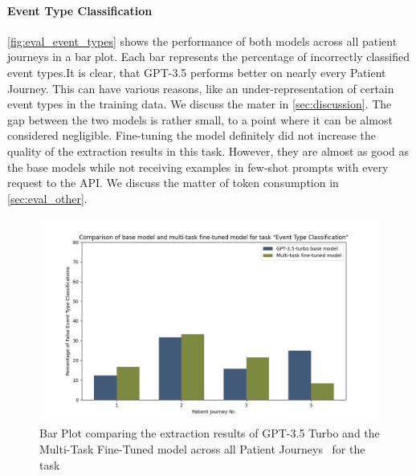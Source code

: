 \paragraph{Event Type Classification} \autoref{fig:eval_event_types} shows the performance of both models across all patient journeys in a bar plot. Each bar represents the percentage of incorrectly classified event types.It is clear, that GPT-3.5 performs better on nearly every Patient Journey. This can have various reasons, like an under-representation of certain event types in the training data. We discuss the mater in \autoref{sec:discussion}. The gap between the two models is rather small, to a point where it can be almost considered negligible. Fine-tuning the model definitely did not increase the quality of the extraction results in this task. However, they are almost as good as the base models while not receiving examples in few-shot prompts with every request to the API. We discuss the matter of token consumption in \autoref{sec:eval_other}.
\begin{figure}
    \centering
    \includegraphics[width=\textwidth]{bachelor_thesis/images/event_types_all.png}
    \caption{Bar Plot comparing the extraction results of GPT-3.5 Turbo and the Multi-Task Fine-Tuned model across all Patient Journeys~ for the task }
    \label{fig:eval_event_types}
\end{figure}


